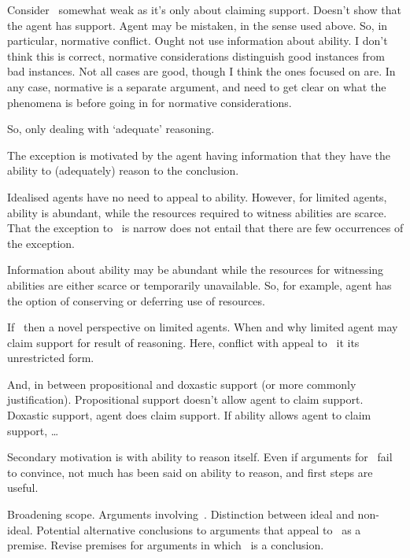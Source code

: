 \begin{note}
  Consider~\rC{} somewhat weak as it's only about claiming support.
  Doesn't show that the agent has support.
  Agent may be mistaken, in the sense used above.
  So, in particular, normative conflict.
  Ought not use information about ability.
  I don't think this is correct, normative considerations distinguish good instances from bad instances.
  Not all cases are good, though I think the ones focused on are.
  In any case, normative is a separate argument, and need to get clear on what the phenomena is before going in for normative considerations.

  So, only dealing with `adequate' reasoning.
\end{note}

\begin{note}[Ability]
  The exception is motivated by the agent having information that they have the ability to (adequately) reason to the conclusion.

  Idealised agents have no need to appeal to ability.
  However, for limited agents, ability is abundant, while the resources required to witness abilities are scarce.
  That the exception to~\uRa{} is narrow does not entail that there are few occurrences of the exception.

  Information about ability may be abundant while the resources for witnessing abilities are either scarce or temporarily unavailable.
  So, for example, agent has the option of conserving or deferring use of resources.

  If~\rC{} then a novel perspective on limited agents.
  When and why limited agent may claim support for result of reasoning.
  Here, conflict with appeal to~\uRa{} it its unrestricted form.

  And, in between propositional and doxastic support (or more commonly justification).
  Propositional support doesn't allow agent to claim support.
  Doxastic support, agent does claim support.
  If ability allows agent to claim support, \dots

  Secondary motivation is with ability to reason itself.
  Even if arguments for~\rC{} fail to convince, not much has been said on ability to reason, and first steps are useful.
\end{note}

\begin{note}
  Broadening scope.
  Arguments involving~\uRa{}.
  Distinction between ideal and non-ideal.
  Potential alternative conclusions to arguments that appeal to~\uRa{} as a premise.
  Revise premises for arguments in which~\uRa{} is a conclusion.
\end{note}

